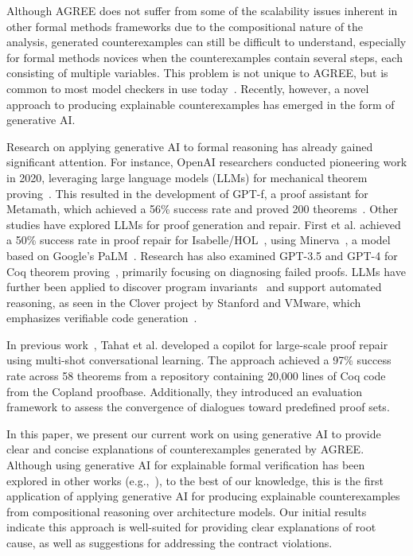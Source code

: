 Although AGREE does not suffer from some of the scalability issues inherent in other formal methods frameworks due to the compositional nature of the analysis, generated counterexamples can still be difficult to understand, especially for formal methods novices when the counterexamples contain several steps, each consisting of multiple variables.  This problem is not unique to AGREE, but is common to most model checkers in use today~\cite{cex-explanation}.  
Recently, however, a novel approach to producing explainable counterexamples has emerged in the form of generative AI.

Research on applying generative AI to formal reasoning has already gained significant attention. For instance, OpenAI researchers conducted pioneering work in 2020, leveraging large language models (LLMs) for mechanical theorem proving~\cite{polu2020generative}. This resulted in the development of GPT-f, a proof assistant for Metamath, which achieved a 56\% success rate and proved 200 theorems~\cite{megill2019metamath}. Other studies have explored LLMs for proof generation and repair. First et al. achieved a 50\% success rate in proof repair for Isabelle/HOL~\cite{first2023baldur}, using Minerva~\cite{lewkowycz2022solving}, a model based on Google’s PaLM~\cite{chowdhery2022palm}. Research has also examined GPT-3.5 and GPT-4 for Coq theorem proving~\cite{zhang2023getting}, primarily focusing on diagnosing failed proofs. LLMs have further been applied to discover program invariants~\cite{pei2023can, wu2023lemur} and support automated reasoning, as seen in the Clover project by Stanford and VMware, which emphasizes verifiable code generation~\cite{sun2024clover}.

In previous work~\cite{CoqDog, CoqDogHCSS24}, Tahat et al. developed a copilot for large-scale proof repair using multi-shot conversational learning. The approach achieved a 97\% success rate across 58 theorems from a repository containing 20,000 lines of Coq code from the Copland proofbase. Additionally, they introduced an evaluation framework to assess the convergence of dialogues toward predefined proof sets.
%

In this paper, we present our current work on using generative AI to provide clear and concise explanations of counterexamples generated by AGREE.  
%
Although using generative AI for explainable formal verification has been explored in other works (e.g.,~\cite{martins-ersa23}), to the best of our knowledge, this is the first application of applying generative AI for producing explainable counterexamples from compositional reasoning over architecture models.
%
Our initial results indicate this approach is well-suited for providing clear explanations of root cause, as well as suggestions for addressing the contract violations.